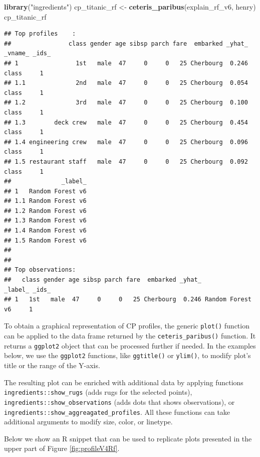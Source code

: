 \documentclass[12pt,]{krantz}
\newenvironment{Shaded}{\begin{snugshade}}{\end{snugshade}}
\newcommand{\KeywordTok}[1]{\textcolor[rgb]{0.13,0.29,0.53}{\textbf{#1}}}
\newcommand{\NormalTok}[1]{#1}
\newcommand{\StringTok}[1]{\textcolor[rgb]{0.31,0.60,0.02}{#1}}
\begin{document}
\begin{Shaded}
\begin{Highlighting}[]
\KeywordTok{library}\NormalTok{(}\StringTok{"ingredients"}\NormalTok{)}
\NormalTok{cp_titanic_rf <-}\StringTok{ }\KeywordTok{ceteris_paribus}\NormalTok{(explain_rf_v6, henry)}
\NormalTok{cp_titanic_rf}
\end{Highlighting}
\end{Shaded}

\begin{verbatim}
## Top profiles    : 
##                class gender age sibsp parch fare  embarked _yhat_ _vname_ _ids_
## 1                1st   male  47     0     0   25 Cherbourg  0.246   class     1
## 1.1              2nd   male  47     0     0   25 Cherbourg  0.054   class     1
## 1.2              3rd   male  47     0     0   25 Cherbourg  0.100   class     1
## 1.3        deck crew   male  47     0     0   25 Cherbourg  0.454   class     1
## 1.4 engineering crew   male  47     0     0   25 Cherbourg  0.096   class     1
## 1.5 restaurant staff   male  47     0     0   25 Cherbourg  0.092   class     1
##              _label_
## 1   Random Forest v6
## 1.1 Random Forest v6
## 1.2 Random Forest v6
## 1.3 Random Forest v6
## 1.4 Random Forest v6
## 1.5 Random Forest v6
## 
## 
## Top observations:
##   class gender age sibsp parch fare  embarked _yhat_          _label_ _ids_
## 1   1st   male  47     0     0   25 Cherbourg  0.246 Random Forest v6     1
\end{verbatim}

To obtain a graphical representation of CP profiles, the generic \texttt{plot()} function can be applied to the data frame returned by the \texttt{ceteris\_paribus()} function. It returns a \texttt{ggplot2} object that can be processed further if needed. In the examples below, we use the \texttt{ggplot2} functions, like \texttt{ggtitle()} or \texttt{ylim()}, to modify plot's title or the range of the Y-axis.

The resulting plot can be enriched with additional data by applying functions \texttt{ingredients::show\_rugs} (adds rugs for the selected points), \texttt{ingredients::show\_observations} (adds dots that shows observations), or \texttt{ingredients::show\_aggreagated\_profiles}. All these functions can take additional arguments to modify size, color, or linetype.

Below we show an R snippet that can be used to replicate plots presented in the upper part of Figure \ref{fig:profileV4Rf}.
\end{document}
